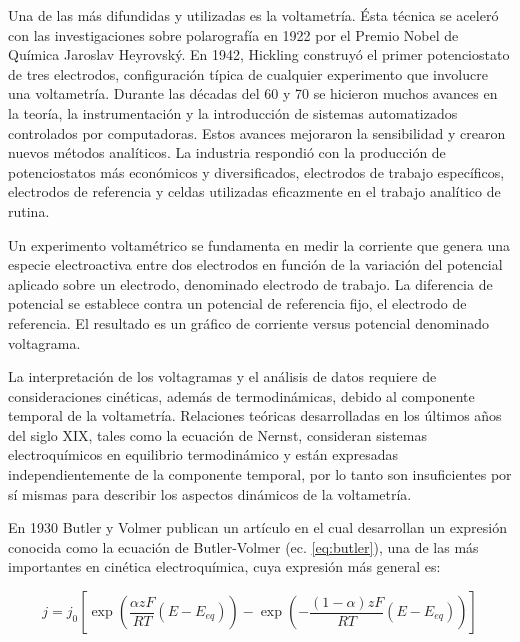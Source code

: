 		Una de las más difundidas y utilizadas es la voltametría. Ésta técnica se aceleró con las investigaciones sobre polarografía en 1922 por el Premio Nobel de Química Jaroslav Heyrovský.\cite{Zuman1960} En 1942, Hickling construyó el primer potenciostato de tres electrodos, configuración típica de cualquier experimento que involucre una voltametría. \cite{hickling1942} Durante las décadas del 60 y 70 se hicieron muchos avances en la teoría, la instrumentación y la introducción de sistemas automatizados controlados por computadoras. Estos avances mejoraron la sensibilidad y crearon nuevos métodos analíticos. La industria respondió con la producción de potenciostatos más económicos y diversificados, electrodos de trabajo específicos, electrodos de referencia y celdas utilizadas eficazmente en el trabajo analítico de rutina.\cite{Wi2000}

		Un experimento voltamétrico se fundamenta en medir la corriente que genera una especie electroactiva entre dos electrodos en función de la variación del potencial aplicado sobre un electrodo, denominado electrodo de trabajo. La diferencia de potencial se establece contra un potencial de referencia fijo, el electrodo de referencia. El resultado es un gráfico de corriente versus potencial denominado voltagrama.

		La interpretación de los voltagramas y el análisis de datos requiere de consideraciones cinéticas, además de termodinámicas, debido al componente temporal de la voltametría. Relaciones teóricas desarrolladas en los últimos años del siglo XIX, tales como la ecuación de Nernst, consideran sistemas electroquímicos en equilibrio termodinámico y están expresadas independientemente de la componente temporal, por lo tanto son insuficientes por sí mismas para describir los aspectos dinámicos de la voltametría.\cite{nicholson1964}

		En 1930 Butler y Volmer publican un artículo en el cual desarrollan un expresión conocida como la ecuación de Butler-Volmer (ec. \ref{eq:butler}), una de las más importantes en cinética electroquímica, cuya expresión más general es\cite{Erdey-Gruz1930}: 

			\vspace*{3mm}
			\begin{equation}
			j=j_0\left[\exp\left(\frac{\alpha zF}{RT}(E-E_{eq})\right)-\exp\left(-\frac{(1-\alpha)zF}{RT}(E-E_{eq})\right)\right]
			\label{eq:butler}
			\end{equation}
			\vspace*{3mm}

